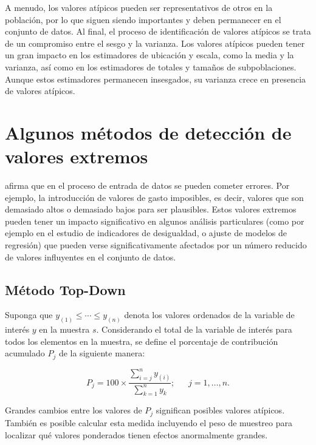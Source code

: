 \documentclass[
  12pt,
  spanish,
]{book}
\begin{document}
A menudo, los valores atípicos pueden ser representativos de otros en la población, por lo que siguen siendo importantes y deben permanecer en el conjunto de datos. Al final, el proceso de identificación de valores atípicos se trata de un compromiso entre el sesgo y la varianza. Los valores atípicos pueden tener un gran impacto en los estimadores de ubicación y escala, como la media y la varianza, así como en los estimadores de totales y tamaños de subpoblaciones. Aunque estos estimadores permanecen insesgados, su varianza crece en presencia de valores atípicos.

\hypertarget{algunos-muxe9todos-de-detecciuxf3n-de-valores-extremos}{%
\section{Algunos métodos de detección de valores extremos}\label{algunos-muxe9todos-de-detecciuxf3n-de-valores-extremos}}

\citet{Filzmoser_Gussenbauer_Templ_2016} afirma que en el proceso de entrada de datos se pueden cometer errores. Por ejemplo, la introducción de valores de gasto imposibles, es decir, valores
que son demasiado altos o demasiado bajos para ser plausibles. Estos valores extremos pueden tener
un impacto significativo en algunos análisis particulares (como por ejemplo en el estudio de indicadores de desigualdad,
o ajuste de modelos de regresión) que pueden verse significativamente afectados por un número reducido de
valores influyentes en el conjunto de datos.

\hypertarget{muxe9todo-top-down}{%
\subsection{Método Top-Down}\label{muxe9todo-top-down}}

Suponga que \(y_{(1)}\le\cdots\le y_{(n)}\) denota los valores ordenados de la variable de interés \(y\) en la muestra \(s\). Considerando el total de la variable de interés para todos los elementos en la muestra, se define el porcentaje de contribución acumulado \(P_j\) de la siguiente manera:

\[
P_j=100\times\frac{\sum_{i=j}^n y_{(i)}}{\sum_{k=1}^n y_k}; \ \ \ \ \ \ \ j = 1, \ldots, n.
\]

Grandes cambios entre los valores de \(P_j\) significan posibles valores atípicos. También es posible calcular esta medida incluyendo el peso de muestreo para localizar qué valores ponderados tienen efectos anormalmente grandes.
\end{document}

